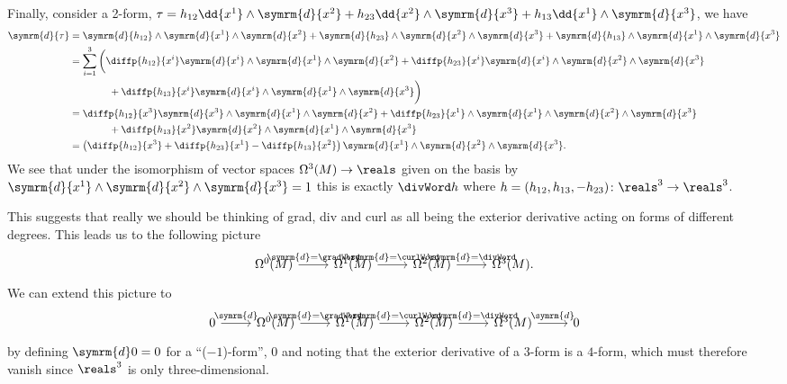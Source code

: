 \documentclass[fleqn]{NotesClass}
\renewcommand{\dl}{\symrm{d}}
\begin{document}
    Finally, consider a 2-form, \(\tau = h_{12} \dd{x^1} \wedge \dl{x^2} + h_{23} \dd{x^2} \wedge \dl{x^3} + h_{13} \dd{x^1} \wedge \dl{x^3}\), we have
    \begin{align}
        \dl{\tau} &= \dl{h_{12}} \wedge \dl{x^1} \wedge \dl{x^2} + \dl{h_{23}} \wedge \dl{x^2} \wedge \dl{x^3} + \dl{h_{13}} \wedge \dl{x^1} \wedge \dl{x^3}\\
        &= \sum_{i=1}^3 \bigg( \diffp{h_{12}}{x^i} \dl{x^i} \wedge \dl{x^1} \wedge \dl{x^2} + \diffp{h_{23}}{x^i} \dl{x^i} \wedge \dl{x^2} \wedge \dl{x^3}\\
        &\qquad\qquad + \diffp{h_{13}}{x^i} \dl{x^i} \wedge \dl{x^1} \wedge \dl{x^3} \bigg)\\
        &= \diffp{h_{12}}{x^3} \dl{x^3} \wedge \dl{x^1} \wedge \dl{x^2} + \diffp{h_{23}}{x^1} \wedge \dl{x^1} \wedge \dl{x^2} \wedge \dl{x^3}\\
        &\qquad\qquad+ \diffp{h_{13}}{x^2} \dl{x^2} \wedge \dl{x^1} \wedge \dl{x^3}\\
        &= \left( \diffp{h_{12}}{x^3} + \diffp{h_{23}}{x^1} - \diffp{h_{13}}{x^2} \right) \dl{x^1} \wedge \dl{x^2} \wedge \dl{x^3}.
    \end{align}
    We see that under the isomorphism of vector spaces \(\Omega^3(M) \to \reals\) given on the basis by \(\dl{x^1} \wedge \dl{x^2} \wedge \dl{x^3} = 1\) this is exactly \(\divWord h\) where \(h = (h_{12}, h_{13}, -h_{23}) \colon \reals^3 \to \reals^3\).
    
    This suggests that really we should be thinking of grad, div and curl as all being the exterior derivative acting on forms of different degrees.
    This leads us to the following picture
    \begin{equation}
        \begin{tikzcd}
            \Omega^0(M) \arrow[r, "\dl = \gradWord"] & \Omega^1(M) \arrow[r, "\dl = \curlWord"] & \Omega^2(M) \arrow[r, "\dl = \divWord"] & \Omega^3(M).
        \end{tikzcd}
    \end{equation}
    We can extend this picture to
    \begin{equation}
        \begin{tikzcd}
            0 \arrow[r, "\dl"] & \Omega^0(M) \arrow[r, "\dl = \gradWord"] & \Omega^1(M) \arrow[r, "\dl = \curlWord"] & \Omega^2(M) \arrow[r, "\dl = \divWord"] & \Omega^3(M) \arrow[r, "\dl"] & 0
        \end{tikzcd}
    \end{equation}
    by defining \(\dl 0 = 0\) for a \enquote{(\(-1\))-form}, \(0\) and noting that the exterior derivative of a \(3\)-form is a \(4\)-form, which must therefore vanish since \(\reals^3\) is only three-dimensional.
    
\end{document}
